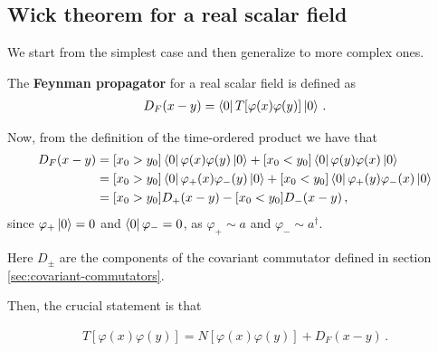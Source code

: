 \documentclass[main.tex]{subfiles}
\begin{document}
\subsection{Wick theorem for a real scalar field}

We start from the simplest case and then generalize to more complex ones. 

\begin{definition}
The \textbf{Feynman propagator} for a real scalar field is defined as 
%
\begin{align}
D_F (x-y) = \bra{0} T[\varphi (x) \varphi (y)] \ket{0} 
\,.
\end{align}
\end{definition}

Now, from the definition of the time-ordered product we have that 
%
\begin{subequations}
\begin{align}
D_F (x-y) &= 
[x_0 > y_0 ]
\bra{0} \varphi (x) \varphi (y) \ket{0}
+
[x_0 < y_0 ]
\bra{0} \varphi (y) \varphi (x) \ket{0}  \\
&= 
[x_0 > y_0 ]
\bra{0} \varphi_{+} (x) \varphi_{-} (y) \ket{0}
+
[x_0 < y_0 ]
\bra{0} \varphi_{+} (y) \varphi_{-} (x) \ket{0}  \\
&= 
[x_0 > y_0 ]
D_+ (x-y)
-
[x_0 < y_0 ]
D_- (x-y) 
\,,
\end{align}
\end{subequations}
%
since \(\varphi_{+} \ket{0} = 0\) and \(\bra{0} \varphi_{-} = 0 \), as \(\varphi_{+} \sim a\) and \(\varphi_{-} \sim a ^\dag\).

Here \(D_{\pm}\) are the components of the covariant commutator defined in section \ref{sec:covariant-commutators}. 

Then, the crucial statement is that
\begin{claim}
\begin{align}
T [\varphi (x) \varphi (y)] = N[\varphi (x) \varphi (y)] + D_F (x-y)
\,.
\end{align}
\end{claim}
\end{document}
